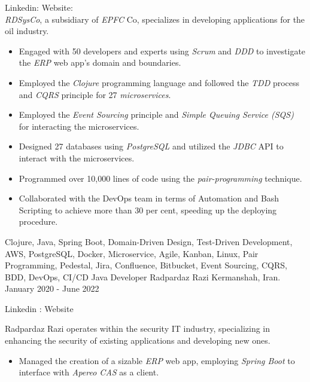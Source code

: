 \begin{experiences}
{
  Linkedin: 
  Website: \\
  \emph{RDSysCo}, a subsidiary of \emph{EPFC} Co, specializes in developing applications for the oil industry.
  \begin{itemize}
  \item Engaged with 50 developers and experts using \emph{Scrum} and \emph{DDD} to investigate the \textit{ERP} web app's domain and boundaries.
  \item Employed the \emph{Clojure} programming language and followed the \emph{TDD} process and \textit{CQRS} principle for 27 \emph{microservices}.
  \item Employed the \textit{Event Sourcing} principle and \textit{Simple Queuing Service (SQS)} for interacting the microservices.
  \item Designed 27 databases using \emph{PostgreSQL} and utilized the \emph{JDBC} API to interact with the microservices.
  \item Programmed over 10,000 lines of code using the \emph{pair-programming} technique.
  \item Collaborated with the DevOps team in terms of Automation and Bash Scripting to achieve more than 30 per cent, speeding up the deploying procedure.
  \end{itemize}}{Clojure, Java, Spring Boot, Domain-Driven Design, Test-Driven Development, AWS, PostgreSQL, Docker, Microservice, Agile, Kanban, Linux, Pair Programming, Pedestal, Jira, Confluence, Bitbucket, Event Sourcing, CQRS, BDD, DevOps, CI/CD}
 \emptySeparator
\experience
{}
{Java Developer}
{Radpardaz Razi}
{Kermanshah, Iran. \hspace{170 pt} January 2020 - June 2022}
{}
{
Linkedin : 
Website 
\par{Radpardaz Razi operates within the security IT industry, specializing in enhancing the security of existing applications and developing new ones.}
\begin{itemize}
\item Managed the creation of a sizable \emph{ERP} web app, employing \emph{Spring Boot} to interface with \emph{Apereo CAS} as a client.

\end{itemize}}
\end{experiences}
